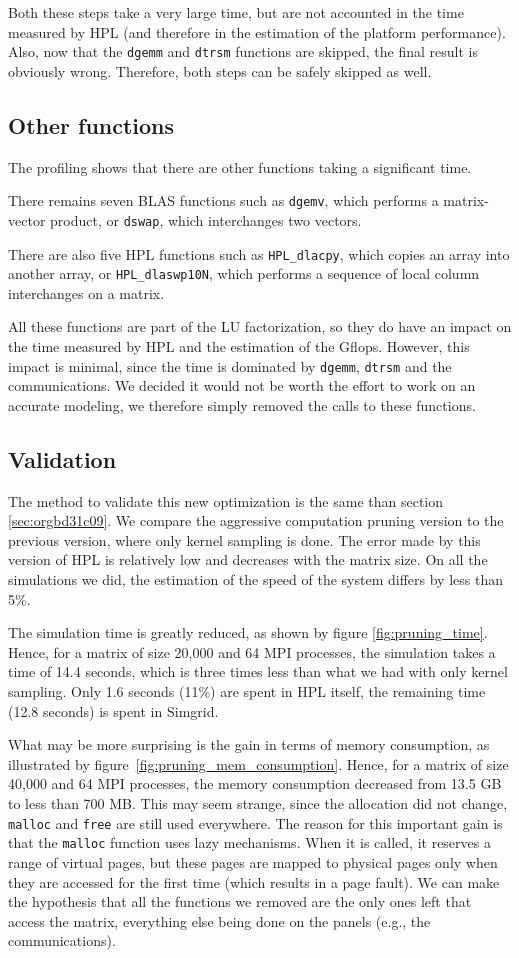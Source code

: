 \documentclass[12pt, a4paper]{memoir}
\begin{document}
Both these steps take a very large time, but are not accounted in the time measured by HPL (and therefore in the
estimation of the platform performance). Also, now that the \texttt{dgemm} and \texttt{dtrsm} functions are skipped, the final result
is obviously wrong. Therefore, both steps can be safely skipped as well.
\subsection{Other functions}
\label{sec:org0ca7701}
The profiling shows that there are other functions taking a significant time.

There remains seven BLAS functions such as \texttt{dgemv}, which performs a matrix-vector product, or \texttt{dswap}, which
interchanges two vectors.

There are also five HPL functions such as \texttt{HPL\_dlacpy}, which copies an array into another array, or \texttt{HPL\_dlaswp10N},
which performs a sequence of local column interchanges on a matrix.

All these functions are part of the LU factorization, so they do have an impact on the time measured by HPL and the
estimation of the Gflops. However, this impact is minimal, since the time is dominated by \texttt{dgemm}, \texttt{dtrsm} and the
communications. We decided it would not be worth the effort to work on an accurate modeling, we therefore simply
removed the calls to these functions.
\subsection{Validation}
\label{sec:org658fe06}
The method to validate this new optimization is the same than section \ref{sec:orgbd31c09}. We compare the
aggressive computation pruning version to the previous version, where only kernel sampling is done.  The error made
by this version of HPL is relatively low and decreases with the matrix size. On all the simulations we did, the
estimation of the speed of the system differs by less than 5\%.

The simulation time is greatly reduced, as shown by figure \ref{fig:pruning_time}. Hence, for a matrix of size
20,000 and 64 MPI processes, the simulation takes a time of 14.4 seconds, which is three times less than what we had
with only kernel sampling. Only 1.6 seconds (11\%) are spent in HPL itself, the remaining time (12.8 seconds) is
spent in Simgrid.

What may be more surprising is the gain in terms of memory consumption, as illustrated by
figure~\ref{fig:pruning_mem_consumption}. Hence, for a matrix of size 40,000 and 64 MPI processes, the memory
consumption decreased from 13.5 GB to less than 700 MB.  This may seem strange, since the allocation did not change,
\texttt{malloc} and \texttt{free} are still used everywhere. The reason for this important gain is that the \texttt{malloc} function uses lazy
mechanisms. When it is called, it reserves a range of virtual pages, but these pages are mapped to physical pages
only when they are accessed for the first time (which results in a page fault). We can make the hypothesis that all
the functions we removed are the only ones left that access the matrix, everything else being done on the panels
(e.g., the communications).
\end{document}
